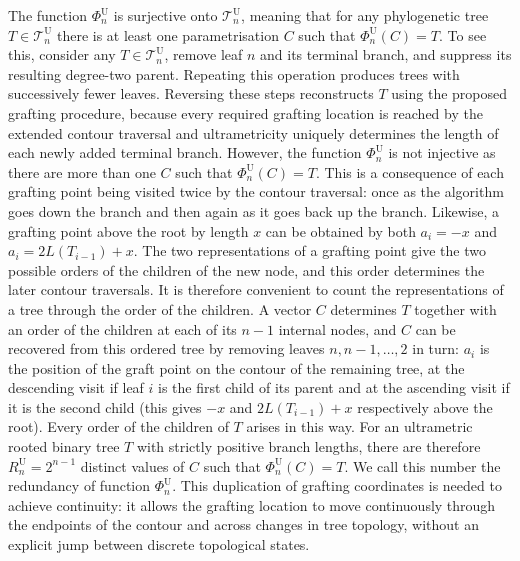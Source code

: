 \documentclass{article}
\begin{document}
The function $\Phi_n^\mathrm{U}$ is surjective onto $\mathcal{T}_n^\mathrm{U}$, 
meaning that for any phylogenetic tree $T \in \mathcal{T}_n^\mathrm{U}$ there is at least
one parametrisation $C$ such that $\Phi_n^\mathrm{U}(C)=T$. 
To see this, consider any $T\in\mathcal{T}_n^\mathrm{U}$, remove leaf $n$ and its terminal branch, 
and suppress its resulting degree-two parent. 
Repeating this operation produces trees with successively fewer leaves. Reversing these steps reconstructs $T$ using the proposed grafting procedure, because every required grafting location is reached by the extended
contour traversal and ultrametricity uniquely determines the length of
each newly added terminal branch.
However, the function $\Phi_n^\mathrm{U}$ is not injective as there
are more than one $C$ such that $\Phi_n^\mathrm{U}(C)=T$. This is a consequence of each grafting point being
visited twice by the contour traversal: once as the algorithm goes down the branch and then
again as it goes back up the branch. Likewise, a grafting point above the root by length $x$
can be obtained by both $a_i=-x$ and $a_i=2L(T_{i-1})+x$.
The two representations of a grafting point give the two possible orders of
the children of the new node, and this order determines the later contour
traversals. It is therefore convenient to count the representations of a tree
through the order of the children. A vector $C$ determines $T$ together with an
order of the children at each of its $n-1$ internal nodes, and $C$ can be
recovered from this ordered tree by removing leaves $n,n-1,\dots,2$ in turn:
$a_i$ is the position of the graft point on the contour of the remaining tree,
at the descending visit if leaf $i$ is the first child of its parent and at the
ascending visit if it is the second child (this gives $-x$ and $2L(T_{i-1})+x$
respectively above the root). Every order of the children of $T$ arises in
this way. For an ultrametric rooted binary tree $T$ with strictly positive
branch lengths, there are therefore $R^{\mathrm U}_n=2^{n-1}$ distinct values
of $C$ such that $\Phi^{\mathrm U}_n(C)=T$. We call this number the redundancy
of function $\Phi^{\mathrm U}_n$.
This duplication of grafting coordinates is needed to achieve continuity: it allows the grafting location 
to move continuously through the endpoints of the contour and across changes in tree topology, without 
an explicit jump between discrete topological states.
\end{document}
